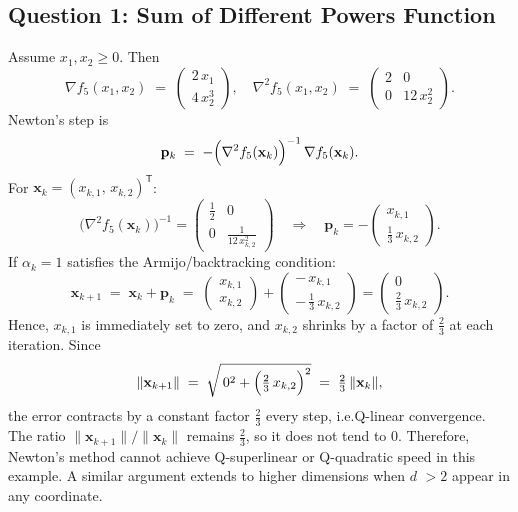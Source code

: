 \documentclass[12pt]{article}
\begin{document}
\subsection{Question 1: Sum of Different Powers Function}
Assume \(x_1, x_2 \ge 0\). Then
\[
\nabla f_5(x_1, x_2) 
\;=\;
\begin{pmatrix}
2\,x_1\\
4\,x_2^3
\end{pmatrix},
\quad
\nabla^2 f_5(x_1,x_2) 
\;=\;
\begin{pmatrix}
2 & 0\\[4pt]
0 & 12\,x_2^2
\end{pmatrix}.
\]
Newton’s step is
\[
\mathbf{p}_k 
\;=\;
- \Bigl(\nabla^2 f_5(\mathbf{x}_k)\Bigr)^{-1}
\, \nabla f_5(\mathbf{x}_k).
\]
For \(\mathbf{x}_k = (x_{k,1},\, x_{k,2})^\mathsf{T}\):
\[
\bigl(\nabla^2 f_5(\mathbf{x}_k)\bigr)^{-1}
=
\begin{pmatrix}
\tfrac{1}{2} & 0 \\
0 & \tfrac{1}{12\,x_{k,2}^2}
\end{pmatrix}
\quad\Longrightarrow\quad
\mathbf{p}_k 
=
-\begin{pmatrix}
x_{k,1}\\[3pt]
\tfrac{1}{3}\,x_{k,2}
\end{pmatrix}.
\]
If \(\alpha_k = 1\) satisfies the Armijo/backtracking condition:
\[
\mathbf{x}_{k+1} 
\;=\;
\mathbf{x}_k + \mathbf{p}_k 
\;=\;
\begin{pmatrix}
x_{k,1}\\
x_{k,2}
\end{pmatrix}
+
\begin{pmatrix}
-\,x_{k,1}\\[3pt]
-\,\tfrac{1}{3}\,x_{k,2}
\end{pmatrix}
=
\begin{pmatrix}
0\\[3pt]
\tfrac{2}{3}\,x_{k,2}
\end{pmatrix}.
\]
Hence, \(x_{k,1}\) is immediately set to zero, and \(x_{k,2}\) shrinks by a factor of \(\tfrac{2}{3}\) at each iteration.
Since 
\[
\|\mathbf{x}_{k+1}\| 
\;=\;
\sqrt{\,0^2 + \Bigl(\tfrac{2}{3}\,x_{k,2}\Bigr)^2}
\;=\;
\tfrac{2}{3}\,\|\mathbf{x}_k\|,
\]
the error contracts by a constant factor \(\tfrac{2}{3}\) every step, i.e.Q-linear convergence. The ratio \(\|\mathbf{x}_{k+1}\| / \|\mathbf{x}_k\|\) remains \(\tfrac{2}{3}\), so it does not tend to \(0\). Therefore, Newton’s method cannot achieve Q-superlinear or Q-quadratic speed in this example. A similar argument extends to higher dimensions when $d$ \(> 2\) appear in any coordinate.
\end{document}
